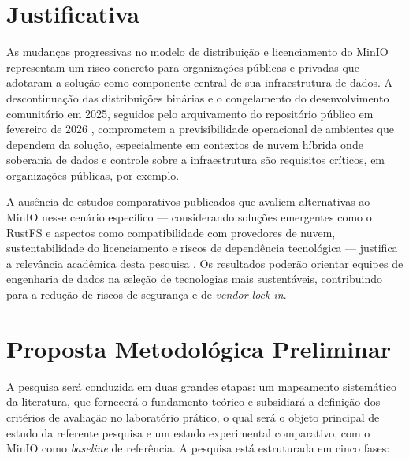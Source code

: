 \documentclass[bacharelado]{pre-projeto-computacao}
\begin{document}
\section*{Justificativa}

As mudanças progressivas no modelo de distribuição e licenciamento do MinIO
representam um risco concreto para organizações públicas e privadas que adotaram
a solução como componente central de sua infraestrutura de dados. A descontinuação
das distribuições binárias e o congelamento do desenvolvimento comunitário em 2025,
seguidos pelo arquivamento do repositório público em fevereiro de 2026
\cite{faun2026, minio2026repo}, comprometem a previsibilidade operacional de
ambientes que dependem da solução, especialmente em contextos de nuvem híbrida
onde soberania de dados e controle sobre a infraestrutura são requisitos críticos, em
organizações públicas, por exemplo.

A ausência de estudos comparativos publicados que avaliem alternativas ao MinIO
nesse cenário específico --- considerando soluções emergentes como o RustFS e
aspectos como compatibilidade com provedores de nuvem, sustentabilidade do
licenciamento e riscos de dependência tecnológica --- justifica a relevância
acadêmica desta pesquisa \cite{tast2026comparative}. Os resultados poderão
orientar equipes de engenharia de dados na seleção de tecnologias mais sustentáveis,
contribuindo para a redução de riscos de segurança e de \textit{vendor lock-in}.


\section*{Proposta Metodológica Preliminar}

A pesquisa será conduzida em duas grandes etapas: um mapeamento sistemático da
literatura, que fornecerá o fundamento teórico e subsidiará a definição dos critérios
de avaliação no laboratório prático, o qual será o objeto principal de estudo da referente pesquisa e um estudo experimental comparativo, com o MinIO como
\textit{baseline} de referência. A pesquisa está estruturada em cinco fases:
\end{document}
